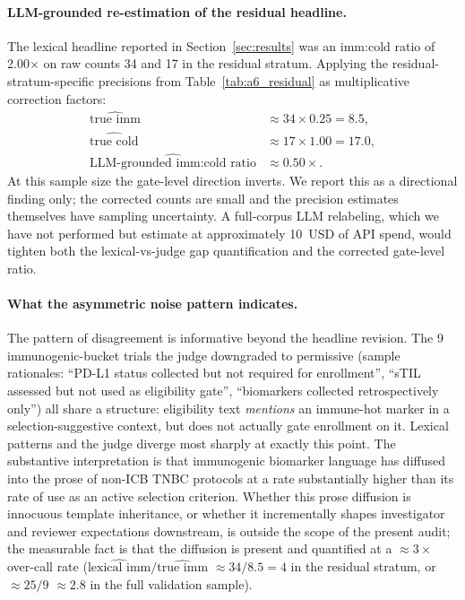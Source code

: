\documentclass{article}
\begin{document}
\paragraph{LLM-grounded re-estimation of the residual headline.}
The lexical headline reported in Section~\ref{sec:results} was an
imm:cold ratio of 2.00$\times$ on raw counts 34 and 17 in the
residual stratum.  Applying the residual-stratum-specific
precisions from Table~\ref{tab:a6_residual} as multiplicative
correction factors:
\begin{align*}
\widehat{\text{true imm}} &\approx 34 \times 0.25 = 8.5, \\
\widehat{\text{true cold}} &\approx 17 \times 1.00 = 17.0, \\
\widehat{\text{LLM-grounded imm:cold ratio}} &\approx 0.50\times.
\end{align*}
At this sample size the gate-level direction inverts.  We report
this as a directional finding only; the corrected counts are small
and the precision estimates themselves have sampling uncertainty.
A full-corpus LLM relabeling, which we have not performed but
estimate at approximately 10~USD of API spend, would tighten both
the lexical-vs-judge gap quantification and the corrected
gate-level ratio.

\paragraph{What the asymmetric noise pattern indicates.}
The pattern of disagreement is informative beyond the headline
revision.  The 9 immunogenic-bucket trials the judge downgraded to
permissive (sample rationales: ``PD-L1 status collected but not
required for enrollment'', ``sTIL assessed but not used as
eligibility gate'', ``biomarkers collected retrospectively only'')
all share a structure: eligibility text \emph{mentions} an
immune-hot marker in a selection-suggestive context, but does not
actually gate enrollment on it.  Lexical patterns and the judge
diverge most sharply at exactly this point.  The substantive
interpretation is that immunogenic biomarker language has diffused
into the prose of non-ICB TNBC protocols at a rate substantially
higher than its rate of use as an active selection criterion.
Whether this prose diffusion is innocuous template inheritance, or
whether it incrementally shapes investigator and reviewer
expectations downstream, is outside the scope of the present audit;
the measurable fact is that the diffusion is present and quantified
at a $\approx 3\times$ over-call rate
($\widehat{\text{lexical imm}} / \widehat{\text{true imm}}$
$\approx 34/8.5 = 4$ in the residual stratum, or $\approx 25/9$
$\approx 2.8$ in the full validation sample).
\end{document}
